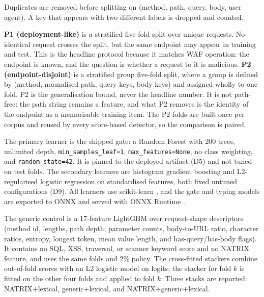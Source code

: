 \documentclass[preprint,11pt]{elsarticle}
\begin{document}
Duplicates are removed before splitting on (method, path, query, body,
user agent). A key that appears with two different labels is dropped and
counted.

\textbf{P1 (deployment-like)} is a stratified five-fold split over
unique requests. No identical request crosses the split, but the same
endpoint may appear in training and test. This is the headline protocol
because it matches WAF operation: the endpoint is known, and the
question is whether a request to it is malicious. \textbf{P2
(endpoint-disjoint)} is a stratified group five-fold split, where a
group is defined by (method, normalised path, query keys, body keys) and
assigned wholly to one fold. P2 is the generalisation bound, never the
headline number. It is not path-free: the path string remains a feature,
and what P2 removes is the identity of the endpoint as a memorisable
training item. The P2 folds are built once per corpus and reused by
every score-based detector, so the comparison is paired.

The primary learner is the shipped gate: a Random Forest
\citep{breiman2001random} with 200 trees, unlimited depth,
\texttt{min\_\allowbreak{}samples\_\allowbreak{}leaf=1}, \texttt{max\_\allowbreak{}features=None}, no class
weighting, and \texttt{random\_\allowbreak{}state=42}. It is pinned to the deployed
artifact (D5) and not tuned on test folds. The secondary learners are
histogram gradient boosting and L2-regularised logistic regression on
standardised features, both fixed untuned configurations (D9). All
learners use scikit-learn \citep{pedregosa2011scikit}, and the gate and
typing models are exported to ONNX and served with ONNX Runtime
\citep{onnxruntime2024}.

The generic control is a 17-feature LightGBM over request-shape
descriptors (method id, lengths, path depth, parameter counts,
body-to-URL ratio, character ratios, entropy, longest token, mean value
length, and has-query/has-body flags). It contains no SQL, XSS,
traversal, or scanner keyword score and no NATRIX feature, and uses the
same folds and 2\% policy. The cross-fitted stackers combine out-of-fold
scores with an L2 logistic model on logits; the stacker for fold \(k\)
is fitted on the other four folds and applied to fold \(k\). Three
stacks are reported: NATRIX+lexical, generic+lexical, and
NATRIX+generic+lexical.
\end{document}
